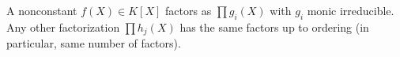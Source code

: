 A nonconstant $f(X) \in K[X]$ factors as $\prod g_i(X)$ with $g_i$ monic irreducible. Any other factorization $\prod h_j(X)$ has the same factors up to ordering (in particular, same number of factors).
